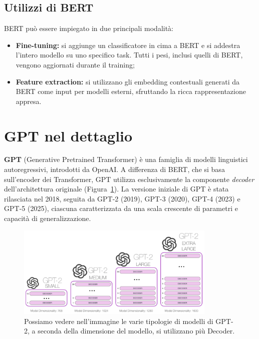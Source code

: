 \subsection{Utilizzi di BERT}

BERT può essere impiegato in due principali modalità:

\begin{itemize}
    \item \textbf{Fine-tuning:} si aggiunge un classificatore in cima a BERT e si addestra l'intero modello su uno specifico task. Tutti i pesi, inclusi quelli di BERT, vengono aggiornati durante il training;
    \item \textbf{Feature extraction:} si utilizzano gli embedding contestuali generati da BERT come input per modelli esterni, sfruttando la ricca rappresentazione appresa.
\end{itemize}

\section{GPT nel dettaglio}

\textbf{GPT} (Generative Pretrained Transformer) è una famiglia di modelli linguistici autoregressivi, introdotti da OpenAI. A differenza di BERT, che si basa sull’encoder dei Transformer, GPT utilizza esclusivamente la componente \textit{decoder} dell'architettura originale (Figura~\ref{fig:GPTModel}). La versione iniziale di GPT è stata rilasciata nel 2018, seguita da GPT-2 (2019), GPT-3 (2020), GPT-4 (2023) e GPT-5 (2025), ciascuna caratterizzata da una scala crescente di parametri e capacità di generalizzazione.

\begin{figure}
    \centering
    \includegraphics[width=0.85\textwidth]{figure/GPTModel}
    \caption{Possiamo vedere nell'immagine le varie tipologie di modelli di GPT-2, a seconda della dimensione del modello, si utilizzano più Decoder.}
    \label{fig:GPTModel}
\end{figure}

